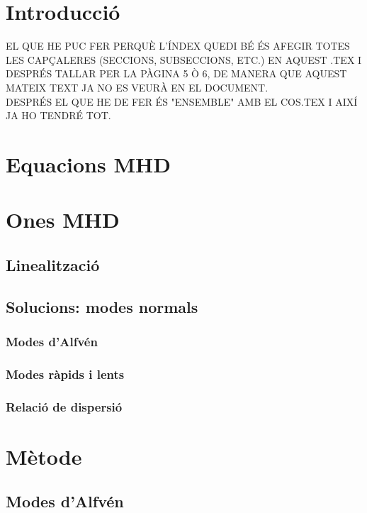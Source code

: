 {\thispagestyle{empty}
\let\cleardoublepage\clearpage
\tableofcontents
{}
\thispagestyle{empty}
\let\cleardoublepage\clearpage
{\selectfont


\chapter{Introducció}

EL QUE HE PUC FER PERQUÈ L'ÍNDEX QUEDI BÉ ÉS AFEGIR TOTES LES CAPÇALERES (SECCIONS, SUBSECCIONS, ETC.) EN AQUEST .TEX I DESPRÉS TALLAR PER LA PÀGINA 5 Ò 6, DE MANERA QUE AQUEST MATEIX TEXT JA NO ES VEURÀ EN EL DOCUMENT. \\

DESPRÉS EL QUE HE DE FER ÉS "ENSEMBLE" AMB EL COS.TEX I AIXÍ JA HO TENDRÉ TOT.

\chapter{Equacions MHD}

\chapter{Ones MHD}
\section{Linealització}
\section{Solucions: modes normals}
\subsection{Modes d'Alfvén}
\subsection{Modes ràpids i lents}
\subsection{Relació de dispersió}

\chapter{Mètode}
\section{Modes d'Alfvén}
}}
